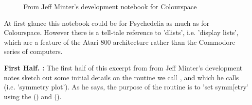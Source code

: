%
\begin{figure}[H]
    \centering
    \begin{adjustbox}{width=13cm,center}
    \end{adjustbox}
\caption{From Jeff Minter's development notebook for Colourspace}
\end{figure}
\clearpage
At first glance this notebook could be for Psychedelia as much as for Colourspace. However there is a tell-tale reference
to 'dlists', i.e. 'display lists', which are a feature of the Atari 800 architecture rather than the Commodore series of 
computers.

\textbf{First Half. :} 
The first half of this excerpt from from Jeff Minter's development notes sketch out some initial details on the routine
we call , and which he calls  (i.e. 'symmetry plot'). As he says, the
purpose of the routine is to 'set symm[etry' using the  () and  ().

